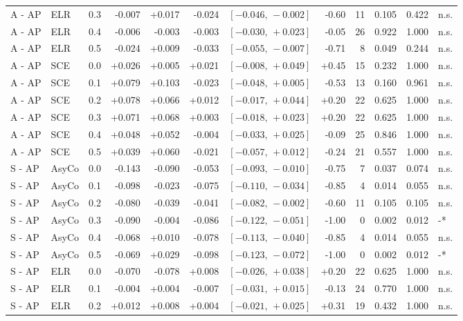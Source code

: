 \begin{landscape}
\begin{scriptsize}
\begin{longtable}{lllrrrrrrrrl}
A - AP & ELR & 0.3 & -0.007 & +0.017 & -0.024 & $[-0.046,\,-0.002]$ & -0.60 & 11 & 0.105 & 0.422 & n.s. \\
A - AP & ELR & 0.4 & -0.006 & -0.003 & -0.003 & $[-0.030,\,+0.023]$ & -0.05 & 26 & 0.922 & 1.000 & n.s. \\
A - AP & ELR & 0.5 & -0.024 & +0.009 & -0.033 & $[-0.055,\,-0.007]$ & -0.71 & 8 & 0.049 & 0.244 & n.s. \\
A - AP & SCE & 0.0 & +0.026 & +0.005 & +0.021 & $[-0.008,\,+0.049]$ & +0.45 & 15 & 0.232 & 1.000 & n.s. \\
A - AP & SCE & 0.1 & +0.079 & +0.103 & -0.023 & $[-0.048,\,+0.005]$ & -0.53 & 13 & 0.160 & 0.961 & n.s. \\
A - AP & SCE & 0.2 & +0.078 & +0.066 & +0.012 & $[-0.017,\,+0.044]$ & +0.20 & 22 & 0.625 & 1.000 & n.s. \\
A - AP & SCE & 0.3 & +0.071 & +0.068 & +0.003 & $[-0.018,\,+0.023]$ & +0.20 & 22 & 0.625 & 1.000 & n.s. \\
A - AP & SCE & 0.4 & +0.048 & +0.052 & -0.004 & $[-0.033,\,+0.025]$ & -0.09 & 25 & 0.846 & 1.000 & n.s. \\
A - AP & SCE & 0.5 & +0.039 & +0.060 & -0.021 & $[-0.057,\,+0.012]$ & -0.24 & 21 & 0.557 & 1.000 & n.s. \\
S - AP & AsyCo & 0.0 & -0.143 & -0.090 & -0.053 & $[-0.093,\,-0.010]$ & -0.75 & 7 & 0.037 & 0.074 & n.s. \\
S - AP & AsyCo & 0.1 & -0.098 & -0.023 & -0.075 & $[-0.110,\,-0.034]$ & -0.85 & 4 & 0.014 & 0.055 & n.s. \\
S - AP & AsyCo & 0.2 & -0.080 & -0.039 & -0.041 & $[-0.082,\,-0.002]$ & -0.60 & 11 & 0.105 & 0.105 & n.s. \\
S - AP & AsyCo & 0.3 & -0.090 & -0.004 & -0.086 & $[-0.122,\,-0.051]$ & -1.00 & 0 & 0.002 & 0.012 & -* \\
S - AP & AsyCo & 0.4 & -0.068 & +0.010 & -0.078 & $[-0.113,\,-0.040]$ & -0.85 & 4 & 0.014 & 0.055 & n.s. \\
S - AP & AsyCo & 0.5 & -0.069 & +0.029 & -0.098 & $[-0.123,\,-0.072]$ & -1.00 & 0 & 0.002 & 0.012 & -* \\
S - AP & ELR & 0.0 & -0.070 & -0.078 & +0.008 & $[-0.026,\,+0.038]$ & +0.20 & 22 & 0.625 & 1.000 & n.s. \\
S - AP & ELR & 0.1 & -0.004 & +0.004 & -0.007 & $[-0.031,\,+0.015]$ & -0.13 & 24 & 0.770 & 1.000 & n.s. \\
S - AP & ELR & 0.2 & +0.012 & +0.008 & +0.004 & $[-0.021,\,+0.025]$ & +0.31 & 19 & 0.432 & 1.000 & n.s. \\

\end{longtable}
\end{scriptsize}
\end{landscape}
